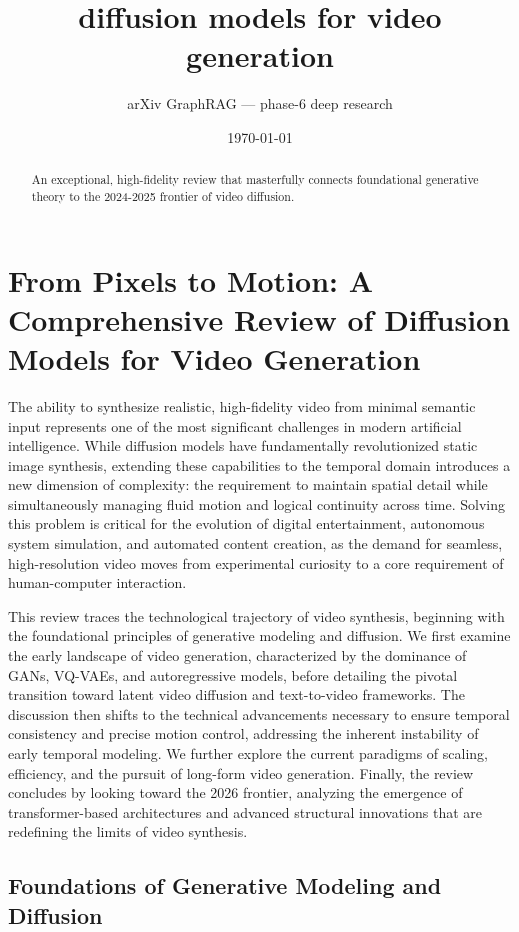 \documentclass[11pt]{article}
\title{diffusion models for video generation}
\author{arXiv GraphRAG --- phase-6 deep research}
\date{\today}
\begin{document}
\maketitle

\begin{abstract}
An exceptional, high-fidelity review that masterfully connects foundational generative theory to the 2024-2025 frontier of video diffusion.
\end{abstract}

\section{From Pixels to Motion: A Comprehensive Review of Diffusion Models for Video Generation}

The ability to synthesize realistic, high-fidelity video from minimal semantic input represents one of the most significant challenges in modern artificial intelligence. While diffusion models have fundamentally revolutionized static image synthesis, extending these capabilities to the temporal domain introduces a new dimension of complexity: the requirement to maintain spatial detail while simultaneously managing fluid motion and logical continuity across time. Solving this problem is critical for the evolution of digital entertainment, autonomous system simulation, and automated content creation, as the demand for seamless, high-resolution video moves from experimental curiosity to a core requirement of human-computer interaction.

This review traces the technological trajectory of video synthesis, beginning with the foundational principles of generative modeling and diffusion. We first examine the early landscape of video generation, characterized by the dominance of GANs, VQ-VAEs, and autoregressive models, before detailing the pivotal transition toward latent video diffusion and text-to-video frameworks. The discussion then shifts to the technical advancements necessary to ensure temporal consistency and precise motion control, addressing the inherent instability of early temporal modeling. We further explore the current paradigms of scaling, efficiency, and the pursuit of long-form video generation. Finally, the review concludes by looking toward the 2026 frontier, analyzing the emergence of transformer-based architectures and advanced structural innovations that are redefining the limits of video synthesis.

\subsection{Foundations of Generative Modeling and Diffusion}
\end{document}

